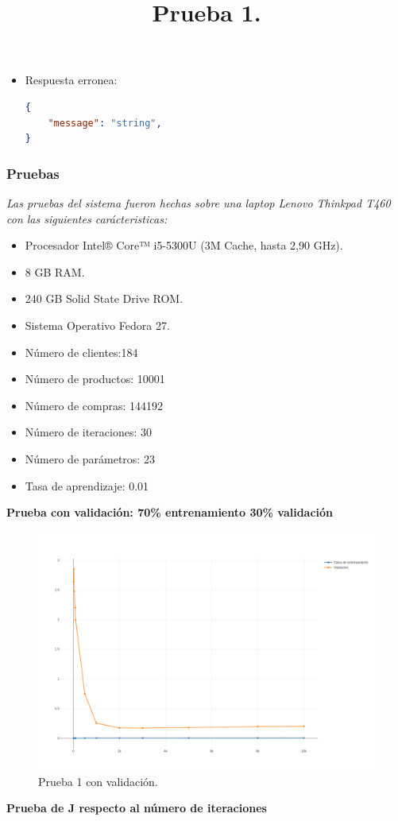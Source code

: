 {{{{\begin{itemize}
\begin{itemize}
\item Respuesta erronea:
\begin{lstlisting}[language=json,firstnumber=1]
{
    "message": "string",
}
\end{lstlisting}
\end{itemize}
\end{itemize}

\subsubsection{Pruebas}
\textit{Las pruebas del sistema fueron hechas sobre una laptop Lenovo Thinkpad T460 con las siguientes carácteristicas:\\}
\begin{itemize}
\item Procesador Intel® Core™ i5-5300U (3M Cache, hasta 2,90 GHz).
\item 8 GB RAM.
\item 240 GB Solid State Drive ROM.
\item Sistema Operativo Fedora 27.
\end{itemize}
\title{\textbf{Prueba 1.}}

\begin{itemize}
\item Número de clientes:184
\item Número de productos: 10001
\item Número de compras: 144192
\item Número de iteraciones: 30
\item Número de parámetros: 23
\item Tasa de aprendizaje: 0.01
\end{itemize}

\textbf{Prueba con validación: 70\% entrenamiento 30\% validación}

\FloatBarrier
\begin{figure}[htbp!]
		\centering
			\includegraphics[width=1 \textwidth]{imagenes/pruebassistemarecom/30_0_23}
		\caption{Prueba 1 con validación.}
\end{figure}
\FloatBarrier
\newpage
\textbf{Prueba de J respecto al número de iteraciones}

}}}}
